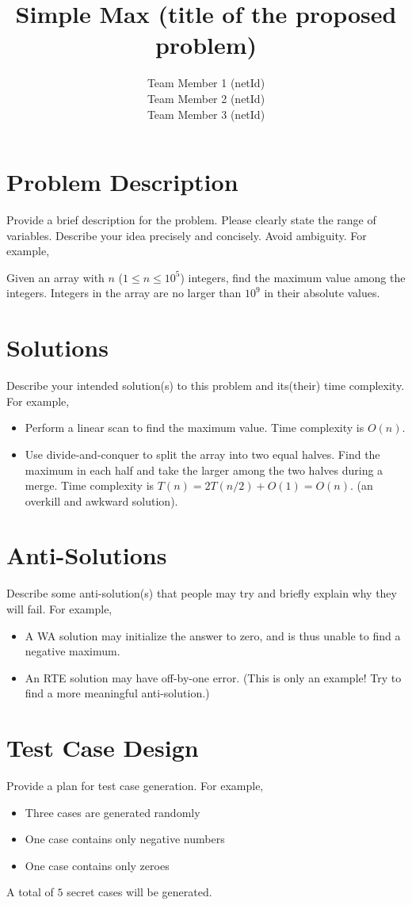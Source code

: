 \documentclass[a4paper,11pt]{article}
\title{Simple Max (title of the proposed problem)}
\author{Team Member 1 (netId) \\
Team Member 2 (netId) \\
Team Member 3 (netId)}
\begin{document}
\maketitle

\section{Problem Description}

Provide a brief description for the problem.
Please clearly state the range of variables.
Describe your idea precisely and concisely.
Avoid ambiguity.
For example,

Given an array with $n$ ($1 \leq n \leq 10^5$) integers, find the maximum value among the integers.
Integers in the array are no larger than $10^9$ in their absolute values.


\section{Solutions}

Describe your intended solution(s) to this problem and its(their) time complexity.
For example,

\begin{itemize}
    \item Perform a linear scan to find the maximum value.
Time complexity is $O(n)$.
    \item Use divide-and-conquer to split the array into two equal halves. Find the maximum in each half and take the larger among the two halves during a merge. Time complexity is $T(n) = 2T(n/2) + O(1) = O(n)$. (an overkill and awkward solution).
\end{itemize}


\section{Anti-Solutions}

Describe some anti-solution(s) that people may try and briefly explain why they will fail.
For example,

\begin{itemize}
    \item A WA solution may initialize the answer to zero, and is thus unable to find a negative maximum.
    \item An RTE solution may have off-by-one error. (This is only an example! Try to find a more meaningful anti-solution.)
\end{itemize}

\section{Test Case Design}

Provide a plan for test case generation.
For example,

\begin{itemize}
    \item Three cases are generated randomly
    \item One case contains only negative numbers
    \item One case contains only zeroes
\end{itemize}

A total of $5$ secret cases will be generated.
\end{document}
